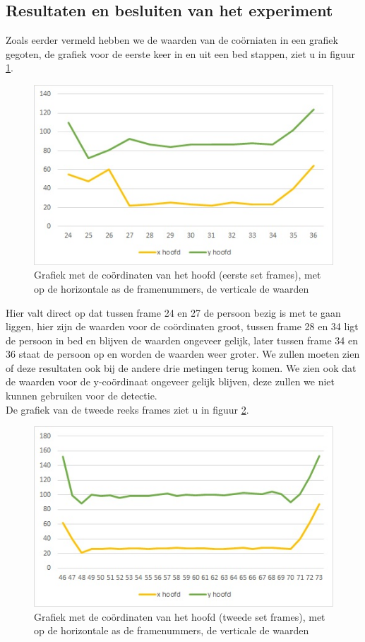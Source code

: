  \subsection{Resultaten en besluiten van het experiment}
 \label{ERefHGDB}
Zoals eerder vermeld hebben we de waarden van de co\"orniaten in een grafiek gegoten, de grafiek voor de eerste keer in en uit een bed stappen, ziet u in figuur \ref{imgCHZ}.
\begin{figure}[hbp]
	\includegraphics[scale = 0.75]{Grafiek_UitBedZ}
	\caption{Grafiek met de co\"ordinaten van het hoofd (eerste set frames), met op de horizontale as de framenummers, de verticale de waarden}
	\label{imgCHZ}
\end{figure}
Hier valt direct op dat tussen frame 24 en 27 de persoon bezig is met te gaan liggen, hier zijn de waarden voor de co\"ordinaten groot, tussen frame 28 en 34 ligt de persoon in bed en blijven de waarden ongeveer gelijk, later tussen frame 34 en 36 staat de persoon op en worden de waarden weer groter. We zullen moeten zien of deze resultaten ook bij de andere drie metingen terug komen. We zien ook dat de waarden voor de y-co\"ordinaat ongeveer gelijk blijven, deze zullen we niet kunnen gebruiken voor de detectie. \\
De grafiek van de tweede reeks frames ziet u in figuur \ref{imgCHZT}.
\begin{figure}[hbp]
	\includegraphics[scale = 0.75]{Grafiek_UitBedZT}
	\caption{Grafiek met de co\"ordinaten van het hoofd (tweede set frames), met op de horizontale as de framenummers, de verticale de waarden}
	\label{imgCHZT}
\end{figure}
